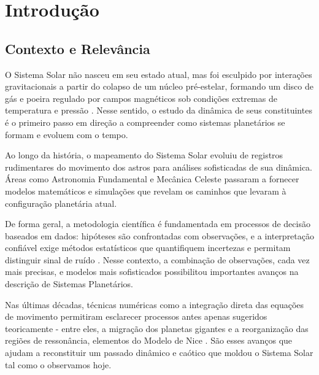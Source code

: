 \documentclass[msc]{on} %
\begin{document}
\listoffigures
\listoftables
\tableofcontents

\mainmatter

\chapter{Introdu\c c\~ao}

\section{Contexto e Relevância}

O Sistema Solar não nasceu em seu estado atual, mas foi esculpido por interações gravitacionais a partir do colapso de um núcleo pré-estelar, formando um disco de gás e poeira regulado por campos magnéticos sob condições extremas de temperatura e pressão \citep{Morbidelli2024}. Nesse sentido, o estudo da dinâmica de seus constituintes é o primeiro passo em direção a compreender como sistemas planetários se formam e evoluem com o tempo.

Ao longo da história, o mapeamento do Sistema Solar evoluiu de registros rudimentares do movimento dos astros para análises sofisticadas de sua dinâmica. Áreas como Astronomia Fundamental e Mecânica Celeste passaram a fornecer modelos matemáticos e simulações que revelam os caminhos que levaram à configuração planetária atual. 

De forma geral, a metodologia científica é fundamentada em processos de decisão baseados em dados: hipóteses são confrontadas com observações, e a interpretação confiável exige métodos estatísticos que quantifiquem incertezas e permitam distinguir sinal de ruído \citep{Wall2003}. Nesse contexto, a combinação de observações, cada vez mais precisas, e modelos mais sofisticados possibilitou importantes avanços na descrição de Sistemas Planetários.

Nas últimas décadas, técnicas numéricas como a integração direta das equações de movimento permitiram esclarecer processos antes apenas sugeridos teoricamente - entre eles, a migração dos planetas gigantes e a reorganização das regiões de ressonância, elementos do Modelo de Nice \citep{Tsiganis2009}. São esses avanços que ajudam a reconstituir um passado dinâmico e caótico que moldou o Sistema Solar tal como o observamos hoje. 
\end{document}
